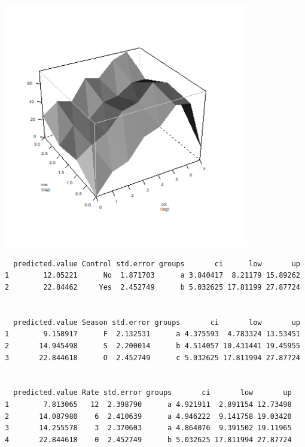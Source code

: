 \documentclass[a4paper, 10pt, fleqn, twosided]{memoir}
\begin{document}
\begin{tcolorbox}[title = Exercise 17 output]
\includegraphics[width=0.8\textwidth, frame]{Exercise17Variogram.png}
\end{tcolorbox}

\begin{tcolorbox}[title = Exercise 17 output continued]
\begin{verbatim}
  predicted.value Control std.error groups       ci      low       up
1        12.05221      No  1.871703      a 3.840417  8.21179 15.89262
2        22.84462     Yes  2.452749      b 5.032625 17.81199 27.87724


  predicted.value Season std.error groups       ci       low       up
1        9.158917      F  2.132531      a 4.375593  4.783324 13.53451
2       14.945498      S  2.200014      b 4.514057 10.431441 19.45955
3       22.844618      O  2.452749      c 5.032625 17.811994 27.87724


  predicted.value Rate std.error groups       ci       low       up
1        7.813065   12  2.398790      a 4.921911  2.891154 12.73498
2       14.087980    6  2.410639      a 4.946222  9.141758 19.03420
3       14.255578    3  2.370603      a 4.864076  9.391502 19.11965
4       22.844618    0  2.452749      b 5.032625 17.811994 27.87724


\end{verbatim}
\end{tcolorbox}
\end{document}
